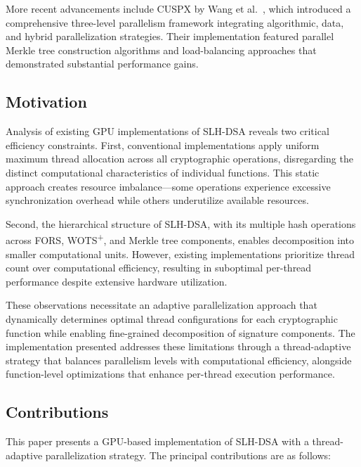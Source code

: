 \documentclass[journal]{IEEEtran}
\begin{document}
More recent advancements include CUSPX by Wang et al.~\cite{Wang2025}, which introduced a comprehensive three-level parallelism framework integrating algorithmic, data, and hybrid parallelization strategies. Their implementation featured parallel Merkle tree construction algorithms and load-balancing approaches that demonstrated substantial performance gains.

\subsection{Motivation}

Analysis of existing GPU implementations of SLH-DSA reveals two critical efficiency constraints. First, conventional implementations apply uniform maximum thread allocation across all cryptographic operations, disregarding the distinct computational characteristics of individual functions. This static approach creates resource imbalance—some operations experience excessive synchronization overhead while others underutilize available resources.

Second, the hierarchical structure of SLH-DSA, with its multiple hash operations across FORS, WOTS\textsuperscript{+}, and Merkle tree components, enables decomposition into smaller computational units. However, existing implementations prioritize thread count over computational efficiency, resulting in suboptimal per-thread performance despite extensive hardware utilization.

These observations necessitate an adaptive parallelization approach that dynamically determines optimal thread configurations for each cryptographic function while enabling fine-grained decomposition of signature components. The implementation presented addresses these limitations through a thread-adaptive strategy that balances parallelism levels with computational efficiency, alongside function-level optimizations that enhance per-thread execution performance.

\subsection{Contributions}


This paper presents a GPU-based implementation of SLH-DSA with a thread-adaptive parallelization strategy. The principal contributions are as follows:
\end{document}
